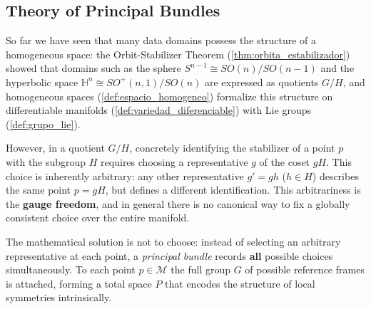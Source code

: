 \subsection{Theory of Principal Bundles}\label{subsec:fibrados_principales}

So far we have seen that many data domains possess the structure of a homogeneous space: the Orbit-Stabilizer Theorem (\ref{thm:orbita_estabilizador}) showed that domains such as the sphere $S^{n-1} \cong SO(n)/SO(n-1)$ and the hyperbolic space $\mathbb{H}^n \cong SO^+(n,1)/SO(n)$ are expressed as quotients $G/H$, and homogeneous spaces (\autoref{def:espacio_homogeneo}) formalize this structure on differentiable manifolds (\autoref{def:variedad_diferenciable}) with Lie groups (\autoref{def:grupo_lie}).

However, in a quotient $G/H$, concretely identifying the stabilizer of a point $p$ with the subgroup $H$ requires choosing a representative $g$ of the coset $gH$. This choice is inherently arbitrary: any other representative $g' = gh$ ($h \in H$) describes the same point $p = gH$, but defines a different identification. This arbitrariness is the \textbf{gauge freedom}, and in general there is no canonical way to fix a globally consistent choice over the entire manifold.

The mathematical solution is not to choose: instead of selecting an arbitrary representative at each point, a \textit{principal bundle} records \textbf{all} possible choices simultaneously. To each point $p \in \mathcal{M}$ the full group $G$ of possible reference frames is attached, forming a total space $P$ that encodes the structure of local symmetries intrinsically.

